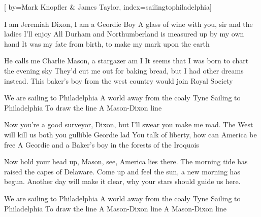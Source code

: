 
[%
    by={Mark Knopfler \& James Taylor},
    index={sailingtophiladelphia}]


    \label{sailingtophiladelphia}

    \beginverse*
    \endverse

    \beginverse\memorize
        I am Jeremiah Dixon, I am a Geordie Boy
        A glass of wine with you, sir and the ladies I'll enjoy
        All Durham and Northumberland is measured up by my own hand
        It was my fate from birth, to make my mark upon the earth
    \endverse

    \beginverse
        He calls me Charlie Mason, a stargazer am I
        It seems that I was born to chart the evening sky
        They'd cut me out for baking bread, but I had other dreams instead.
        This baker's boy from the west country would join Royal Society
    \endverse

    \beginchorus
        We are sailing to Philadelphia
        A world away from the coaly Tyne
        Sailing to Philadelphia
        To draw the line
        A Mason-Dixon line
    \endchorus

    \beginverse*
    \endverse

    \beginverse
        Now you're a good surveyor, Dixon, but I'll swear you make me mad.
        The West will kill us both you gullible Geordie lad
        You talk of liberty, how can America be free
        A Geordie and a Baker's boy in the forests of the Iroquois
    \endverse

    \beginverse
        Now hold your head up, Mason, see, America lies there.
        The morning tide has raised the capes of Delaware.
        Come up and feel the sun, a new morning has begun.
        Another day will make it clear, why your stars should guide us here.
    \endverse

    \beginchorus
        We are sailing to Philadelphia
        A world away from the coaly Tyne
        Sailing to Philadelphia
        To draw the line
        A Mason-Dixon line
        A Mason-Dixon line
    \endchorus

    \beginverse*
    \endverse
\endsong
